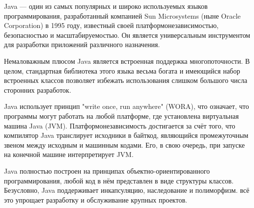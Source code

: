 Java --- один из самых популярных и широко используемых языков программирования, разработанный компанией Sun Microsystems (ныне Oracle Corporation) в 1995 году, известный своей платформонезависимостью, безопасностью и масштабируемостью. Он является универсальным инструментом для разработки приложений различного назначения\cite{JAVA}.

Немаловажным плюсом Java является встроенная поддержка многопоточности. В целом, стандартная библиотека этого языка весьма богата и имеющийся набор встроенных классов позволяет избежать использования слишком большого числа сторонних разработок.

Java использует принцип "write once, run anywhere" (WORA), что означает, что программы могут работать на любой платформе, где установлена виртуальная машина Java (JVM). Платформонезависимость достигается за счёт того, что компилятор Java транслирует исходники в байткод, являющийся промежуточным звеном между исходным и машинным кодами. Его, в свою очередь, при запуске на конечной машине интерпретирует JVM.

Java полностью построен на принципах объектно-ориентированного программирования, любой код в нём представлен в виде структуры классов. Безусловно, Java поддерживает инкапсуляцию, наследование и полиморфизм. всё это упрощает разработку и обслуживание крупных проектов.
